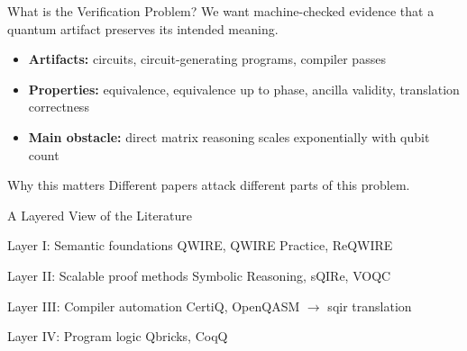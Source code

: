 \documentclass[aspectratio=169]{beamer}
\begin{document}
\begin{frame}{What is the Verification Problem?}
\justifying
We want machine-checked evidence that a quantum artifact preserves its intended meaning.

\vspace{0.7em}

\begin{itemize}
    \item \textbf{Artifacts:} circuits, circuit-generating programs, compiler passes
    \item \textbf{Properties:} equivalence, equivalence up to phase, ancilla validity, translation correctness
    \item \textbf{Main obstacle:} direct matrix reasoning scales exponentially with qubit count
\end{itemize}

\vspace{0.7em}
\begin{block}{Why this matters}
Different papers attack different parts of this problem.
\end{block}
\end{frame}

\begin{frame}{A Layered View of the Literature}
\begin{block}{Layer I: Semantic foundations}
QWIRE, QWIRE Practice, ReQWIRE
\end{block}

\begin{block}{Layer II: Scalable proof methods}
Symbolic Reasoning, sQIRe, VOQC
\end{block}

\begin{block}{Layer III: Compiler automation}
CertiQ, OpenQASM $\to$ sqir translation
\end{block}

\begin{block}{Layer IV: Program logic}
Qbricks, CoqQ
\end{block}
\end{frame}
\end{document}
